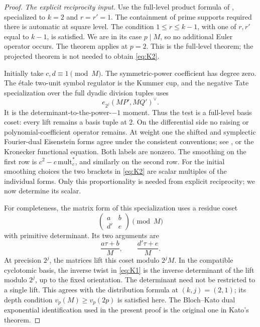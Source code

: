 \begin{proof}
\emph{The explicit reciprocity input.}
Use the full-level product formula of \cite[Theorem~9.5]{Kato04},
specialized to \(k=2\) and \(r=r'=1\).  The containment of prime supports
required there is automatic at square level.  The condition
\(1\leq r\leq k-1\), with one of \(r,r'\) equal to \(k-1\), is satisfied.
We are in its case \(p\mid M\), so no additional Euler operator occurs.
The theorem applies at \(p=2\).  This is the full-level theorem;
the projected theorem \cite[Theorem~9.7]{Kato04} is not needed to obtain
\eqref{eq:K2}.

Initially take \(c,d\equiv1\pmod M\).  The symmetric-power coefficient
has degree zero.  The étale two-unit symbol regulator is the Kummer cup,
and the negative Tate specialization over the full dyadic division
tuples uses
\[
                         e_{2^j}(MP',MQ')^\vee.
\]
It is the determinant-to-the-power-\(-1\) moment.  Thus the test is a
full-level basis coset: every lift remains a basis tuple at 2.  On the
differential side no raising or polynomial-coefficient operator remains.
At weight one the shifted and symplectic Fourier-dual Eisenstein forms
agree under the consistent conventions; see
\cite[Proposition~3.11(1) and \S4.2]{Kato04}, or the Kronecker functional
equation.  Both labels are nonzero.  The smoothing on the first row is
\(c^2-c\,\mathrm{mult}_c^*\), and similarly on the second row.  For the
initial smoothing choices the two brackets in \eqref{eq:K2} are scalar
multiples of the individual forms.  Only this proportionality is needed
from explicit reciprocity; we now determine its scalar.

For completeness, the matrix form of this specialization uses a residue
coset
\[
                \begin{pmatrix}a&b\\ d'&e\end{pmatrix}\pmod M
\]
with primitive determinant.  Its two arguments are
\[
                  \frac{a\tau+b}{M},\qquad
                  \frac{d'\tau+e}{M}.
\]
At precision \(2^j\), the matrices lift this coset modulo \(2^jM\).
In the compatible cyclotomic basis, the inverse twist in
\eqref{eq:K1} is the inverse determinant of the lift modulo \(2^j\),
up to the fixed orientation.  The determinant need not be restricted
to a single lift.  This agrees with the distribution formula
\cite[\S2.3.3, Theorem~1.4, and Proposition~5.5]{Wang12} at
\((k,j)=(2,1)\); its depth condition \(v_p(M)\geq v_p(2p)\)
is satisfied here.  The Bloch--Kato dual exponential identification
used in the present proof is the original one in Kato's theorem.


\end{proof}
